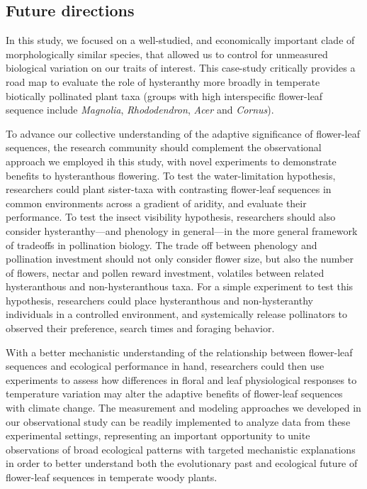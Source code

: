 \documentclass{article}[11pt]
\begin{document}
{\subsection*{Future directions}

In this study, we focused on a well-studied, and economically important clade of morphologically similar species, that allowed us to control for unmeasured biological variation on our traits of interest. This case-study critically provides a road map to evaluate the role of hysteranthy more broadly in temperate biotically pollinated plant taxa (groups with high interspecific flower-leaf sequence include \emph{Magnolia}, \emph{Rhododendron}, \emph{Acer} and \emph{Cornus}). 

To advance our collective understanding of the adaptive significance of flower-leaf sequences, the research community should complement the observational approach we employed ih this study, with novel experiments to demonstrate benefits to hysteranthous flowering. To test the water-limitation hypothesis, researchers could plant sister-taxa with contrasting flower-leaf sequences in common environments across a gradient of aridity, and evaluate their performance. To test the insect visibility hypothesis, researchers should also consider hysteranthy---and phenology in general---in the more general framework of tradeoffs in pollination biology. The trade off between phenology and pollination investment should not only consider flower size, but also the number of flowers, nectar and pollen reward investment, volatiles between related hysteranthous and non-hysteranthous taxa. For a simple experiment to test this hypothesis, researchers could place hysteranthous and non-hysteranthy individuals in a controlled environment, and systemically release pollinators to observed their preference, search times and foraging behavior. 

With a better mechanistic understanding of the relationship between flower-leaf sequences and ecological performance in hand, researchers could then use experiments to assess how differences in floral and leaf physiological responses to temperature variation may alter the adaptive benefits of flower-leaf sequences with climate change. The measurement and modeling approaches we developed in our observational study can be readily implemented to analyze data from these experimental settings, representing an important opportunity to unite observations of broad ecological patterns with targeted mechanistic explanations in order to better understand both the evolutionary past and ecological future of flower-leaf sequences in temperate woody plants.




}
\end{document}
